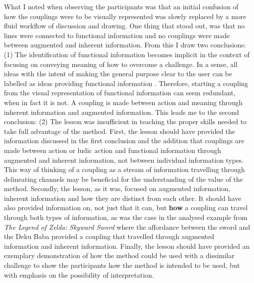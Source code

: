 What I noted when observing the participants was that an initial confusion of how the couplings were to be visually represented was slowly replaced by a more fluid workflow of discussion and drawing. One thing that stood out, was that no lines were connected to functional information and no couplings were made between augmented and inherent information. From this I draw two conclusions: (1) The identification of functional information becomes implicit in the context of focusing on conveying meaning of how to overcome a challenge. In a sense, all ideas with the intent of making the general purpose clear to the user can be labelled as ideas providing functional information \cite{frogger}. Therefore, starting a coupling from the visual representation of functional information can seem redundant, when in fact it is not. A coupling is made between action and meaning through inherent information and augmented information. This leads me to the second conclusion: (2) The lesson was insufficient in teaching the proper skills needed to take full advantage of the method. First, the lesson should have provided the information discussed in the first conclusion and the addition that couplings are made between action or ludic action and functional information through augmented and inherent information, not between individual information types. This way of thinking of a coupling as a stream of information travelling through delineating channels may be beneficial for the understanding of the value of the method. Secondly, the lesson, as it was, focused on augmented information, inherent information and how they are distinct from each other. It should have also provided information on, not just that it can, but \textbf{how} a coupling can travel through both types of information, as was the case in the analysed example from \textit{The Legend of Zelda: Skyward Sword} where the affordance between the sword and the Deku Baba provided a coupling that travelled through augmented information and inherent information. Finally, the lesson should have provided an exemplary demonstration of how the method could be used with a dissimilar challenge to show the participants how the method is intended to be used, but with emphasis on the possibility of interpretation.

